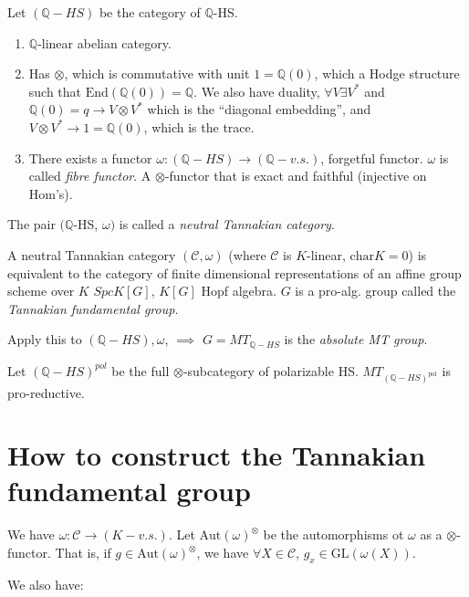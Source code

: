 \medskip\noindent
Let $(\mathbb{Q}-HS)$ be the category
of $\mathbb{Q}$-HS.
\begin{enumerate}
\item $\mathbb{Q}$-linear abelian category.

\item Has $\otimes$, which is commutative
with unit $1=\mathbb{Q}(0)$,
which a Hodge structure such that
$\text{End}(\mathbb{Q}(0))=\mathbb{Q}$.
We also have duality, $\forall V\exists V^*$
and $\mathbb{Q}(0)=q \to V \otimes V^*$
which is the ``diagonal embedding'',
and $V \otimes V^* \to 1=\mathbb{Q}(0)$,
which is the trace.

\item There exists a functor
$\omega:(\mathbb{Q}-HS)\to
(\mathbb{Q}-v.s.)$,
forgetful functor.
$\omega$ is called {\it fibre functor}.
A $\otimes$-functor that is exact and
faithful
(injective on Hom's).
\end{enumerate}

\noindent
The pair $(\mathbb{Q}$-HS, $\omega)$ is
called
a {\it neutral Tannakian category}.

\begin{theorem}
\label{theorem-tannakian}
A neutral Tannakian category
$(\mathcal{C},\omega)$
(where $\mathcal{C}$ is $K$-linear,
$\text{char}K=0$)
is equivalent to the category of finite
dimensional representations of an affine
group scheme over $K$
$Spc K[G]$, $K[G]$ Hopf algebra.
$G$ is a pro-alg. group called the {\it
Tannakian fundamental group}.
\end{theorem}

\noindent
Apply this to $(\mathbb{Q}-HS),\omega$,
$\implies $ $G=MT_{\mathbb{Q}-HS}$ is the
{\it absolute MT group}.

Let  $(\mathbb{Q}-HS)^{pol}$ be the full
$\otimes$-subcategory
of polarizable HS.
$MT_{(\mathbb{Q}-HS)^{\text{pol}}}$ is
pro-reductive.

\section{How to construct the Tannakian
fundamental group}
\label{section-tannakian-fundamental-group}

\noindent
We have $\omega:\mathcal{C}\to (K-v.s.)$.
Let $\text{Aut}(\omega)^{\otimes}$ be the
automorphisms
ot $\omega$ as a $\otimes$-functor.
That is, if $g \in
\text{Aut}(\omega)^{\otimes}$,
we have $\forall  X \in \mathcal{C}$, $g_x\in
\text{GL}(\omega(X))$.

We also have:


